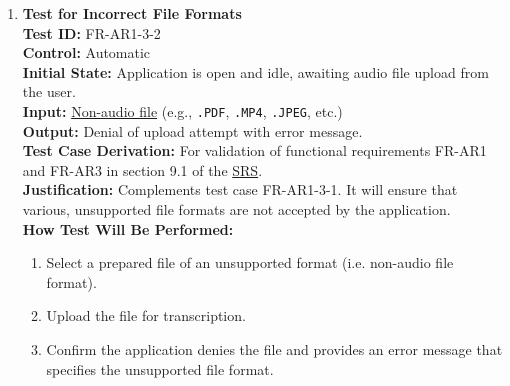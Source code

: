 \documentclass[12pt, titlepage]{article}
\begin{document}
\begin{enumerate}
  \item \textbf{Test for Incorrect File Formats} \\
    \newline
    \textbf{Test ID:} FR-AR1-3-2 \\
    \textbf{Control:} Automatic \\
    \textbf{Initial State:} Application is open and idle, awaiting audio file upload from the user. \\
    \textbf{Input:} \href{https://github.com/emilyperica/ScoreGen/blob/main/test/TestingDatasets/piano-samples/sample-scales/c-major-scale-on-treble-clef.pdf}{Non-audio file} (e.g., \texttt{.PDF}, \texttt{.MP4}, \texttt{.JPEG}, etc.) \\
    \textbf{Output:} Denial of upload attempt with error message. \\
    \textbf{Test Case Derivation:} For validation of functional requirements FR-AR1 and FR-AR3 in section 9.1 of the
    \href{https://github.com/emilyperica/ScoreGen/blob/main/docs/SRS-Volere/SRS.pdf}{SRS}. \\
    \textbf{Justification:} Complements test case FR-AR1-3-1. It will ensure that various, unsupported file formats are 
    not accepted by the application. \\
    \textbf{How Test Will Be Performed:}
    \begin{enumerate}
        \item Select a prepared file of an unsupported format (i.e. non-audio file format).
        \item Upload the file for transcription.
        \item Confirm the application denies the file and provides an error message that specifies the unsupported file format.
    \end{enumerate}
  

\end{enumerate}
\end{document}
